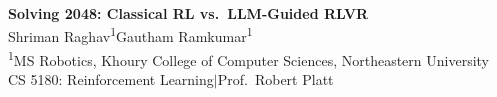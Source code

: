\documentclass[a1paper,portrait]{article}
\begin{document}
\color{darktext}

\begin{tcolorbox}[
  enhanced, colback=headerbg, colframe=headerbg,
  boxrule=0pt, arc=0pt,
  left=22pt, right=22pt, top=14pt, bottom=10pt,
  width=\textwidth, before skip=0pt, after skip=5pt,
]
\begin{center}
{\fontsize{50}{60}\selectfont\bfseries\color{white}
  Solving 2048: Classical RL vs.\ LLM-Guided RLVR}\\[8pt]
{\fontsize{22}{28}\selectfont\color{white!90}
  Shriman Raghav\textsuperscript{1}\qquad Gautham Ramkumar\textsuperscript{1}}\\[5pt]
{\fontsize{17}{21}\selectfont\color{white!75}
  \textsuperscript{1}MS Robotics, Khoury College of Computer Sciences,
  Northeastern University}\\[3pt]
{\fontsize{15}{19}\selectfont\color{white!60}
  CS 5180: Reinforcement Learning\enspace$|$\enspace Prof.\ Robert Platt}
\end{center}
\end{tcolorbox}
\end{document}
